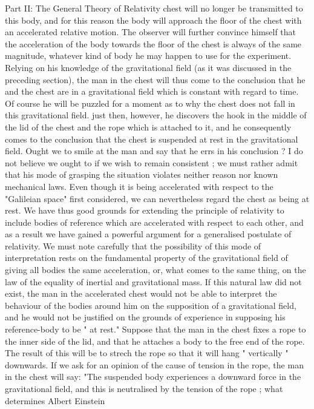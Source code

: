 \documentclass{article}
\begin{document}
Part II: The General Theory of Relativity
chest will no longer be transmitted to this body, and for this reason the body will approach
the floor of the chest with an accelerated relative motion. The observer will further convince
himself that the acceleration of the body towards the floor of the chest is always of the same
magnitude, whatever kind of body he may happen to use for the experiment.
Relying on his knowledge of the gravitational field (as it was discussed in the preceding
section), the man in the chest will thus come to the conclusion that he and the chest are in a
gravitational field which is constant with regard to time. Of course he will be puzzled for a
moment as to why the chest does not fall in this gravitational field. just then, however, he
discovers the hook in the middle of the lid of the chest and the rope which is attached to it,
and he consequently comes to the conclusion that the chest is suspended at rest in the
gravitational field.
Ought we to smile at the man and say that he errs in his conclusion ? I do not believe we
ought to if we wish to remain consistent ; we must rather admit that his mode of grasping
the situation violates neither reason nor known mechanical laws. Even though it is being
accelerated with respect to the "Galileian space" first considered, we can nevertheless
regard the chest as being at rest. We have thus good grounds for extending the principle of
relativity to include bodies of reference which are accelerated with respect to each other,
and as a result we have gained a powerful argument for a generalised postulate of relativity.
We must note carefully that the possibility of this mode of interpretation rests on the
fundamental property of the gravitational field of giving all bodies the same acceleration,
or, what comes to the same thing, on the law of the equality of inertial and gravitational
mass. If this natural law did not exist, the man in the accelerated chest would not be able to
interpret the behaviour of the bodies around him on the supposition of a gravitational field,
and he would not be justified on the grounds of experience in supposing his reference-body
to be " at rest."
Suppose that the man in the chest fixes a rope to the inner side of the lid, and that he
attaches a body to the free end of the rope. The result of this will be to strech the rope so
that it will hang " vertically " downwards. If we ask for an opinion of the cause of tension in
the rope, the man in the chest will say: "The suspended body experiences a downward force
in the gravitational field, and this is neutralised by the tension of the rope ; what determines
Albert Einstein
\end{document}
